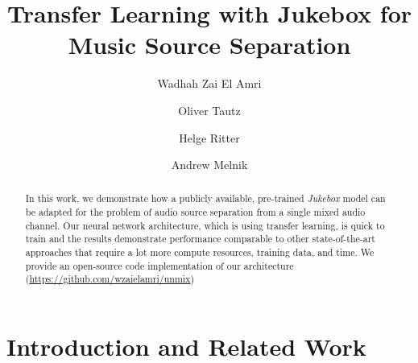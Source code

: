 \documentclass{llncs}
\begin{document}
\mainmatter              \title{Transfer Learning with Jukebox for Music Source Separation}
  \author{Wadhah Zai El Amri\and Oliver Tautz\and Helge Ritter \and Andrew Melnik}
 

\maketitle





\begin{abstract}
In this work, we demonstrate how a publicly available, pre-trained \textit{Jukebox} model can be adapted for the problem of audio source separation from a single mixed audio channel. Our neural network architecture, which is using transfer learning, is quick to train and the results demonstrate performance comparable to other state-of-the-art approaches that require a lot more compute resources, training data, and time. We provide an open-source code implementation of our architecture (\url{https://github.com/wzaielamri/unmix})


\end{abstract}






\section{Introduction and Related Work}
\end{document}
